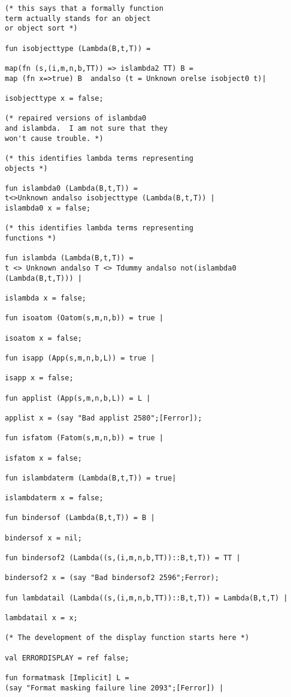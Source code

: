 \documentclass[12pt]{article}
\begin{document}
\begin{verbatim}
(* this says that a formally function
term actually stands for an object
or object sort *)

fun isobjecttype (Lambda(B,t,T)) =

map(fn (s,(i,m,n,b,TT)) => islambda2 TT) B =
map (fn x=>true) B  andalso (t = Unknown orelse isobject0 t)|

isobjecttype x = false;

(* repaired versions of islambda0
and islambda.  I am not sure that they
won't cause trouble. *)

(* this identifies lambda terms representing
objects *)

fun islambda0 (Lambda(B,t,T)) =
t<>Unknown andalso isobjecttype (Lambda(B,t,T)) |
islambda0 x = false;

(* this identifies lambda terms representing
functions *)

fun islambda (Lambda(B,t,T)) =
t <> Unknown andalso T <> Tdummy andalso not(islambda0 (Lambda(B,t,T))) |

islambda x = false;

fun isoatom (Oatom(s,m,n,b)) = true |

isoatom x = false;

fun isapp (App(s,m,n,b,L)) = true |

isapp x = false;

fun applist (App(s,m,n,b,L)) = L |

applist x = (say "Bad applist 2580";[Ferror]);

fun isfatom (Fatom(s,m,n,b)) = true |

isfatom x = false;

fun islambdaterm (Lambda(B,t,T)) = true|

islambdaterm x = false;

fun bindersof (Lambda(B,t,T)) = B |

bindersof x = nil;

fun bindersof2 (Lambda((s,(i,m,n,b,TT))::B,t,T)) = TT |

bindersof2 x = (say "Bad bindersof2 2596";Ferror);

fun lambdatail (Lambda((s,(i,m,n,b,TT))::B,t,T)) = Lambda(B,t,T) |

lambdatail x = x;

(* The development of the display function starts here *)

val ERRORDISPLAY = ref false;

fun formatmask [Implicit] L = 
(say "Format masking failure line 2093";[Ferror]) |


\end{verbatim}
\end{document}
